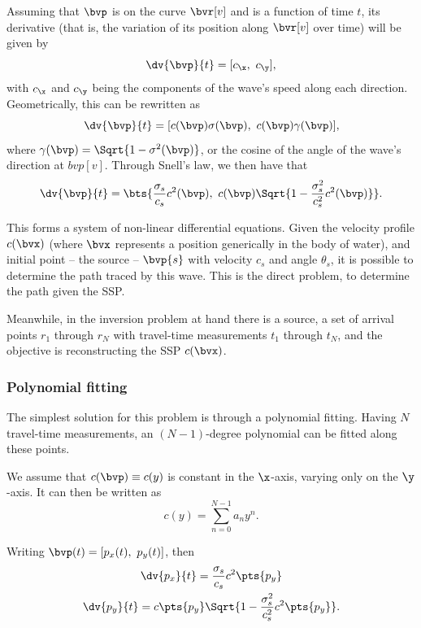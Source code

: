 Assuming that $\bvp$ is on the curve $\bvr[v]$ and is a function of time $t$, its derivative (that is, the variation of its position along $\bvr[v]$ over time) will be given by
\begin{equation}
	\dv{\bvp}{t} = [c_{\x},~c_{\y}],
\end{equation}
with $c_{\x}$ and $c_{\y}$ being the components of the wave's speed along each direction. Geometrically, this can be rewritten as
\begin{equation}
	\dv{\bvp}{t} = [c(\bvp) \sigma(\bvp),~c(\bvp) \gamma(\bvp)],
\end{equation}
where $\gamma(\bvp) = \Sqrt{1-\sigma^2(\bvp)}$, or the cosine of the angle of the wave's direction at $bvp[v]$. Through Snell's law, we then have that
\begin{equation}
	\dv{\bvp}{t} = \bts{\frac{\sigma_s}{c_s}c^2(\bvp),~c(\bvp)\Sqrt{1-\frac{\sigma_s^2}{c_s^2}c^2(\bvp)}}.
\end{equation}

This forms a system of non-linear differential equations. Given the velocity profile $c(\bvx)$ (where $\bvx$ represents a position generically in the body of water), and initial point -- the source -- $\bvp{s}$ with velocity $c_s$ and angle $\theta_s$, it is possible to determine the path traced by this wave. This is the direct problem, to determine the path given the SSP.

Meanwhile, in the inversion problem at hand there is a source, a set of arrival points $r_1$ through $r_N$ with travel-time measurements $t_1$ through $t_N$, and the objective is reconstructing the SSP $c(\bvx)$.

\subsubsection{Polynomial fitting}

The simplest solution for this problem is through a polynomial fitting. Having $N$ travel-time measurements, an $(N-1)$-degree polynomial can be fitted along these points.

We assume that $c(\bvp) \equiv c(y)$ is constant in the $\x$-axis, varying only on the $\y$-axis. It can then be written as
\begin{equation}
	c(y) = \sum_{n=0}^{N-1} a_n y^n.
\end{equation}

Writing $\bvp(t) = [p_x(t),~p_y(t)]$, then
\begin{gather}
	\dv{p_x}{t} = \frac{\sigma_s}{c_s} c^2\pts{p_y} \\
	\dv{p_y}{t} = c\pts{p_y} \Sqrt{1-\frac{\sigma_s^2}{c_s^2}c^2\pts{p_y}}.
\end{gather}

